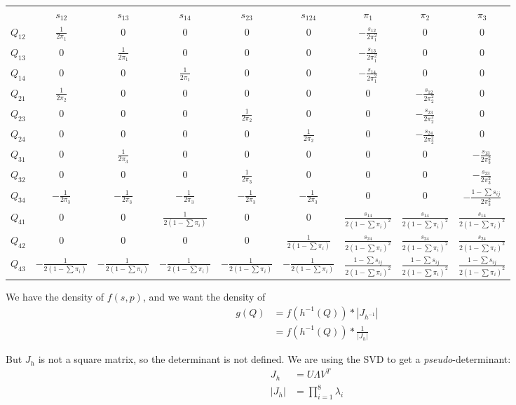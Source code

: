 \documentclass[12pt,letterpaper]{article}
\begin{document}
\begin{table}[ht!]
\centering
\begin{tabular}{cccccc|ccc}
& $s_{12}$ & $s_{13}$ & $s_{14}$ & $s_{23}$ & $s_{124}$ & $\pi_1$ &
$\pi_2$ & $\pi_3$ \\
$Q_{12}$ & $\frac{1}{2\pi_1}$ & 0 & 0 & 0 & 0 &
$-\frac{s_{12}}{2\pi_1^2}$ & 0 & 0\\
$Q_{13}$ & 0 & $\frac{1}{2\pi_1}$ & 0 & 0 & 0 &
$-\frac{s_{13}}{2\pi_1^2}$ & 0 & 0\\
$Q_{14}$ & 0 & 0 & $\frac{1}{2\pi_1}$ & 0 & 0 &
$-\frac{s_{14}}{2\pi_1^2}$ & 0 & 0\\
\hline
$Q_{21}$ & $\frac{1}{2\pi_2}$ & 0 & 0 & 0 & 0 &
0 & $-\frac{s_{12}}{2\pi_2^2}$ & 0\\
$Q_{23}$ & 0 & 0 & 0 & $\frac{1}{2\pi_2}$ & 0 &
0 & $-\frac{s_{23}}{2\pi_2^2}$ & 0\\
$Q_{24}$ & 0 & 0 & 0 & 0 & $\frac{1}{2\pi_2}$ &
0 & $-\frac{s_{24}}{2\pi_2^2}$ & 0\\
\hline
$Q_{31}$ & 0 & $\frac{1}{2\pi_3}$ & 0 & 0 & 0 &
0 & 0 & $-\frac{s_{13}}{2\pi_3^2}$\\
$Q_{32}$ & 0 & 0 & 0 & $\frac{1}{2\pi_3}$ & 0 &
0 & 0 & $-\frac{s_{23}}{2\pi_3^2}$\\
$Q_{34}$ & $-\frac{1}{2\pi_3}$ & $-\frac{1}{2\pi_3}$ & $-\frac{1}{2\pi_3}$ & $-\frac{1}{2\pi_3}$ & $-\frac{1}{2\pi_3}$ &
0 & 0 & $-\frac{1-\sum s_{ij}}{2\pi_3^2}$\\
\hline
$Q_{41}$ & 0 & 0 & $\frac{1}{2(1-\sum \pi_i)}$ & 0 & 0 &
$\frac{s_{14}}{2(1-\sum \pi_i)^2}$ & $\frac{s_{14}}{2(1-\sum \pi_i)^2}$ & $\frac{s_{14}}{2(1-\sum \pi_i)^2}$\\
$Q_{42}$ & 0 & 0 & 0 & 0 & $\frac{1}{2(1-\sum \pi_i)}$ &
$\frac{s_{24}}{2(1-\sum \pi_i)^2}$ & $\frac{s_{24}}{2(1-\sum \pi_i)^2}$ & $\frac{s_{24}}{2(1-\sum \pi_i)^2}$\\
$Q_{43}$ & $-\frac{1}{2(1-\sum \pi_i)}$ & $-\frac{1}{2(1-\sum \pi_i)}$ & $-\frac{1}{2(1-\sum \pi_i)}$ & $-\frac{1}{2(1-\sum \pi_i)}$ & $-\frac{1}{2(1-\sum \pi_i)}$ &
$\frac{1-\sum s_{ij}}{2(1-\sum \pi_i)^2}$ & $\frac{1-\sum
  s_{ij}}{2(1-\sum \pi_i)^2}$ & $\frac{1- \sum s_{ij}}{2(1-\sum \pi_i)^2}$
\end{tabular}
\end{table}

We have the density of $f(s,p)$, and we want the density of
\begin{align*}
g(Q) &= f(h^{-1}(Q))*|J_{h^{-1}}| \\
&= f(h^{-1}(Q))*\frac{1}{|J_{h}|}
\end{align*}

But $J_h$ is not a square matrix, so the determinant is not
defined. We are using the SVD to get a \textit{pseudo}-determinant:
\begin{align*}
J_h & = U \Lambda V^T \\
|J_h| & = \prod_{i=1}^8 \lambda_i
\end{align*}
\end{document}
